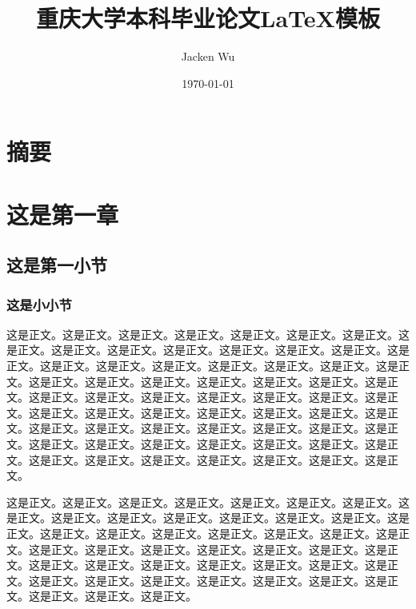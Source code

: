 \documentclass[12pt, a4paper, oneside]{ctexart}
\title{重庆大学本科毕业论文\LaTeX 模板}
\author{Jacken Wu}
\date{\today}
\begin{document}
\maketitle
\thispagestyle{empty}

\newpage

\section*{摘要}
\setcounter{page}{1}

\newpage

\SimSun{\tableofcontents}

\newpage

\section{这是第一章}
\setcounter{page}{1}

\subsection{这是第一小节}

\subsubsection{这是小小节}

这是正文。这是正文。这是正文。这是正文。这是正文。这是正文。这是正文。这是正文。这是正文。这是正文。这是正文。这是正文。这是正文。这是正文。这是正文。这是正文。这是正文。这是正文。这是正文。这是正文。这是正文。这是正文。这是正文。这是正文。这是正文。这是正文。这是正文。这是正文。这是正文。这是正文。这是正文。这是正文。这是正文。这是正文。这是正文。这是正文。这是正文。这是正文。这是正文。这是正文。这是正文。这是正文。这是正文。这是正文。这是正文。这是正文。这是正文。这是正文。这是正文。这是正文。这是正文。这是正文。这是正文。这是正文。这是正文。这是正文。这是正文。这是正文。这是正文。这是正文。这是正文。这是正文。这是正文。这是正文。

这是正文。这是正文。这是正文。这是正文。这是正文。这是正文。这是正文。这是正文。这是正文。这是正文。这是正文。这是正文。这是正文。这是正文。这是正文。这是正文。这是正文。这是正文。这是正文。这是正文。这是正文。这是正文。这是正文。这是正文。这是正文。这是正文。这是正文。这是正文。这是正文。这是正文。这是正文。这是正文。这是正文。这是正文。这是正文。这是正文。这是正文。这是正文。这是正文。这是正文。这是正文。这是正文。这是正文。这是正文。这是正文。这是正文。
\end{document}
